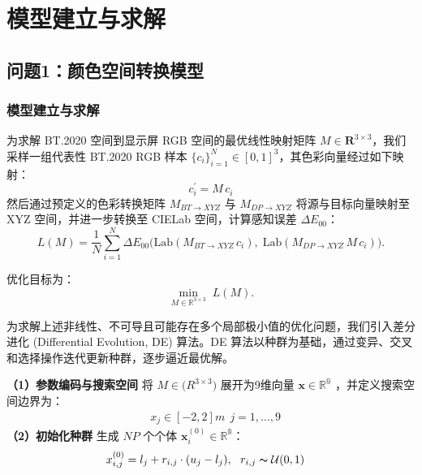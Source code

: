 \chapter[\hspace{0pt}模型建立与求解]{{\heiti{}\hspace{0pt}模型建立与求解}}\label{chapter4: 模型建立与求解}
\removelofgap
\removelotgap

\section[\hspace{-2pt}问题1：颜色空间转换模型]{{\heiti{} \hspace{-8pt}问题1：颜色空间转换模型}}\label{section3: 问题1：颜色空间转换模型}

\subsection[\hspace{-2pt}模型建立与求解]{{\heiti{} \hspace{-8pt}模型建立与求解}}\label{section3: 模型建立与求解}

为求解 BT.2020 空间到显示屏 RGB 空间的最优线性映射矩阵 $M\in \mathbf{R}^{3\times 3}$，我们采样一组代表性 BT.2020 RGB 样本 $\{c_{i}\}_{i=1}^{N}\in [0,1]^{3}$，其色彩向量经过如下映射：
\begin{equation}\label{eq:linear_map}
  c^{'}_{i} = M\,c_{i}
\end{equation}
然后通过预定义的色彩转换矩阵 $M_{BT\rightarrow XYZ}$ 与 $M_{DP\rightarrow XYZ}$ 将源与目标向量映射至 XYZ 空间，并进一步转换至 CIELab 空间，计算感知误差 $\Delta E_{00}$：
\begin{equation}\label{eq:deltaE}
  L(M)=\frac{1}{N}\sum_{i=1}^{N}\Delta E_{00}\bigl(\mathrm{Lab}(M_{BT\rightarrow XYZ}\,c_{i}),\;\mathrm{Lab}(M_{DP\rightarrow XYZ}\,M\,c_{i})\bigr).
\end{equation}

优化目标为：
\begin{equation}\label{eq:opt_obj}
  \underset {M\in \mathbb{R}^{3\times 3}}{\min}\;L(M).
\end{equation}

为求解上述非线性、不可导且可能存在多个局部极小值的优化问题，我们引入差分进化 (Differential Evolution, DE) 算法。DE 算法以种群为基础，通过变异、交叉和选择操作迭代更新种群，逐步逼近最优解。

\noindent\textbf{（1）参数编码与搜索空间}
将 $M\in \mathbb(R^{3\times 3})$ 展开为9维向量 $\mathbf{x}\in \mathbb{R^{9}}$ ，并定义搜索空间边界为：
\begin{equation}
\begin{aligned}
  &x_{j}\in [-2,2]m\ \ j=1,...,9
\end{aligned}
\end{equation}
\noindent\textbf{（2）初始化种群}
生成 $NP$ 个个体 $\mathbf{x}_{i}^{(0)}\in \mathbb{R^{9}}$：
\begin{equation}
\begin{aligned}
  &x^{(0)}_{i,j}=l_{j}+r_{i,j}\cdot (u_{j}-l_{j}),\ \ r_{i,j}\thicksim \mathcal{U}(0,1)
\end{aligned}
\end{equation}

